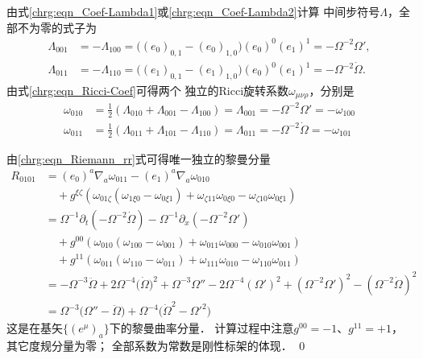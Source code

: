 \noindent {}
由式\eqref{chrg:eqn_Coef-Lambda1}或\eqref{chrg:eqn_Coef-Lambda2}计算
中间步符号$\Lambda$，全部不为零的式子为
\begin{align*}
\Lambda_{001 } &= -\Lambda_{100}
= \bigl( (e_0)_{0,1}-(e_0)_{1,0} \bigr) (e_0)^{0} (e_1)^{1}
=  -\Omega^{-2} \Omega' , \\
\Lambda_{011 } &= -\Lambda_{110}
= \bigl( (e_1)_{0,1}-(e_1)_{1,0} \bigr) (e_0)^{0} (e_1)^{1}
=  -\Omega^{-2} \dot{\Omega} .
\end{align*}
由式\eqref{chrg:eqn_Ricci-Coef}可得两个
独立的Ricci旋转系数$\omega_{\mu\nu\rho}$，分别是
\begin{align*}
\omega_{010} &= \frac{1}{2}\left(\Lambda_{010} + \Lambda_{001} - \Lambda_{100} \right)
= \Lambda_{001} = -\Omega^{-2} \Omega' = -\omega_{100} \\
\omega_{011} &= \frac{1}{2}\left(\Lambda_{011} + \Lambda_{101} - \Lambda_{110} \right)
= \Lambda_{011} = -\Omega^{-2} \dot{\Omega}  = -\omega_{101}
\end{align*}

\noindent {}
由\eqref{chrg:eqn_Riemann_rr}式可得唯一独立的黎曼分量
\begin{align*}
R_{0101} &= (e_0)^a\nabla_a \omega_{011} - (e_1)^a\nabla_a \omega_{010}  \\
&{\quad} + g^{\xi\zeta} \left(
 \omega_{01\zeta} ( \omega_{1\xi 0} - \omega_{0\xi 1} )
+ \omega _{\zeta 11} \omega _{0\xi 0} -\omega _{\zeta 10} \omega _{0\xi 1} \right)   \\
&= \Omega^{-1}\partial_t \left(-\Omega^{-2} \dot{\Omega} \right)
  -\Omega^{-1}\partial_x \left(-\Omega^{-2} \Omega' \right)  \\
&{\quad} + g^{00} ( \omega_{010} (\omega_{100} - \omega_{001} )
+ \omega _{011} \omega _{000} -\omega _{010} \omega _{001} )   \\
&{\quad} + g^{11} ( \omega_{011} ( \omega_{110} - \omega_{011} )
+ \omega _{111} \omega _{010} -\omega _{110} \omega _{011} )   \\
&= -\Omega^{-3} \ddot{\Omega} +2 \Omega^{-4}  \bigl(\dot{\Omega}\bigr)^2
+\Omega^{-3} \Omega'' -2 \Omega^{-4}  (\Omega')^2
 + \left( \Omega^{-2} \Omega' \right)^2
- \left( \Omega^{-2} \dot{\Omega} \right)^2     \\
&= \Omega^{-3} \bigl(\Omega'' -\ddot{\Omega} \bigr)
   +\Omega^{-4} \bigl(\dot{\Omega}^2 - \Omega'^2 \bigr)
\end{align*}
这是在基矢$\{(e^\mu)_{a}\}$下的黎曼曲率分量．
计算过程中注意$g^{00}=-1$、$g^{11}=+1$，其它度规分量为零；
全部系数为常数是刚性标架的体现．
\qed


